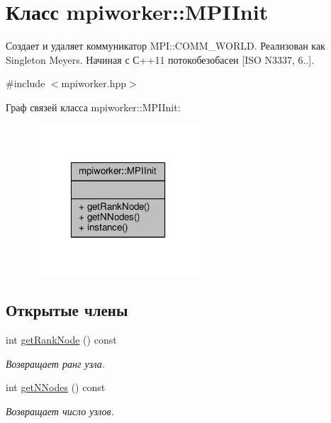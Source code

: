 \hypertarget{classmpiworker_1_1MPIInit}{\section{Класс mpiworker\-:\-:M\-P\-I\-Init}
\label{classmpiworker_1_1MPIInit}
}


Создает и удаляет коммуникатор M\-P\-I\-::\-C\-O\-M\-M\-\_\-\-W\-O\-R\-L\-D. Реализован как Singleton Meyers. Начиная с С++11 потокобезобасен \mbox{[}I\-S\-O N3337, 6..\mbox{]}.  




{\ttfamily \#include $<$mpiworker.\-hpp$>$}



Граф связей класса mpiworker\-:\-:M\-P\-I\-Init\-:\nopagebreak
\begin{figure}[H]
\begin{center}
\leavevmode
\includegraphics[width=178pt]{classmpiworker_1_1MPIInit__coll__graph}
\end{center}
\end{figure}
\subsection*{Открытые члены}
\begin{DoxyCompactItemize}
\item 
int \hyperlink{classmpiworker_1_1MPIInit_a9b44428732f6317268da287d1844d1c9}{get\-Rank\-Node} () const 
\begin{DoxyCompactList}\small\item\em Возвращает ранг узла. \end{DoxyCompactList}\item 
int \hyperlink{classmpiworker_1_1MPIInit_a7b8323075afa7a6d36015e66286183fc}{get\-N\-Nodes} () const 
\begin{DoxyCompactList}\small\item\em Возвращает число узлов. \end{DoxyCompactList}\end{DoxyCompactItemize}
